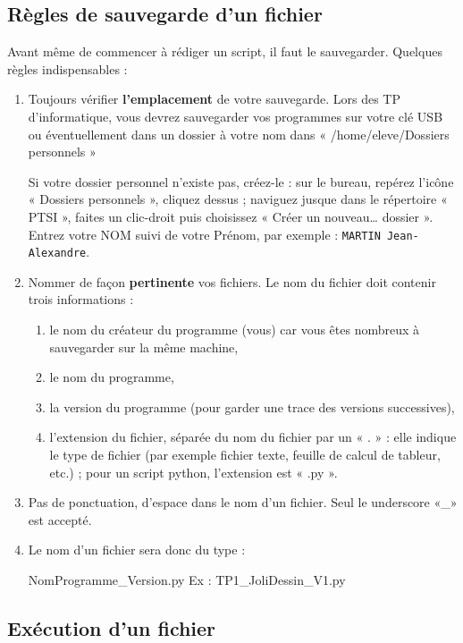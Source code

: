 \subsection{R\` egles de sauvegarde d'un fichier}
Avant m\^ eme de commencer \` a r\' ediger un script, il faut le sauvegarder. Quelques r\` egles indispensables :
\begin{enumerate}
\item Toujours v\' erifier \textbf{l'emplacement} de votre sauvegarde. Lors des TP d'informatique, vous devrez sauvegarder vos programmes sur votre clé USB ou \' eventuellement dans un dossier à votre nom dans « /home/eleve/Dossiers personnels » 

Si votre dossier personnel n'existe pas, créez-le : sur le bureau, repérez l'icône « Dossiers personnels », cliquez dessus ; naviguez jusque dans le répertoire « PTSI », faites un clic-droit puis choisissez « Créer un nouveau{\dots} dossier ». Entrez votre NOM suivi de votre Prénom, par exemple : \texttt{MARTIN Jean-Alexandre}. 

\item Nommer de fa\c  con \textbf{pertinente} vos fichiers. Le nom du fichier doit contenir trois informations :
\begin{enumerate}
\item le nom du cr\' eateur du programme (vous) car vous \^ etes nombreux \` a sauvegarder sur la m\^ eme machine,
\item le nom du programme,
\item la version du programme (pour garder une trace des versions successives),
\item l'extension du fichier, séparée du nom du fichier par un « . » : elle indique le type de fichier (par exemple fichier texte, feuille de calcul de tableur, etc.) ; pour un script python, l'extension est « .py ».
\end{enumerate}
\item Pas de ponctuation, d'espace dans le nom d'un fichier. Seul le underscore «\_»   est accept\' e.
\item Le nom d'un fichier sera donc du type :
\begin{center}
NomProgramme\_Version.py\hspace{2cm} Ex : TP1\_JoliDessin\_V1.py
\end{center}
\end{enumerate}


\subsection{Ex\' ecution d'un fichier}


